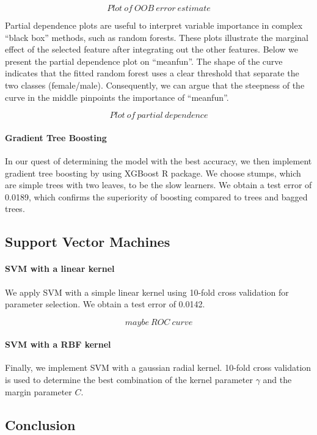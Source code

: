 $$ Plot ~ of ~ OOB~error~ estimate$$ 

Partial dependence plots are useful to interpret variable importance in complex ``black box'' methods, such as random forests. These plots illustrate the marginal effect of the selected feature after integrating out the other features. Below we present the partial dependence plot on ``meanfun''. The shape of the curve indicates that the fitted random forest uses a clear threshold that separate the two classes (female/male). Consequently, we can argue that the steepness of the curve in the middle pinpoints the importance of ``meanfun''. 

$$ Plot ~ of ~ partial~dependence$$

\paragraph{Gradient Tree Boosting}
In our quest of determining the model with the best accuracy, we then implement gradient tree boosting by using XGBoost R package. We choose stumps, which are simple trees with two leaves, to be the slow learners. We obtain a test error of \num{0.0189}, which confirms the superiority of boosting compared to trees and bagged trees.

\subsection{Support Vector Machines}
\paragraph{SVM with a linear kernel}
We apply SVM with a simple linear kernel using \num{10}-fold cross validation for parameter selection. We obtain a test error of \num{0.0142}.

$$ maybe~ROC~curve$$

\paragraph{SVM with a RBF kernel}
Finally, we implement SVM with a gaussian radial kernel. \num{10}-fold cross validation is used to determine the best combination of the kernel parameter $ \gamma $ and the margin parameter $C$. 

\subsection{Conclusion}

